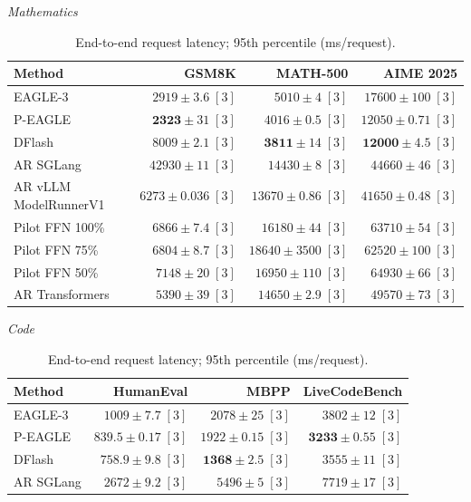 \documentclass[conference,onecolumn]{IEEEtran}
\begin{document}
\begin{table}[!htp]
\centering\small
\setlength{\tabcolsep}{3pt}
\caption{End-to-end request latency; 95th percentile (ms/request).}
\label{tab:appendix-metric-completion-95th-percentile-none}
\textit{Mathematics}\par\smallskip
\begin{tabular}{@{}>{\raggedright\arraybackslash}p{3.7cm}rrr@{}}
\toprule
Method & GSM8K & MATH-500 & AIME 2025 \\
\midrule
EAGLE-3 & \(2919 \pm 3.6\;[3]\) & \(5010 \pm 4\;[3]\) & \(17600 \pm 100\;[3]\) \\
P-EAGLE & \(\mathbf{2323} \pm 31\;[3]\) & \(4016 \pm 0.5\;[3]\) & \(12050 \pm 0.71\;[3]\) \\
DFlash & \(8009 \pm 2.1\;[3]\) & \(\mathbf{3811} \pm 14\;[3]\) & \(\mathbf{12000} \pm 4.5\;[3]\) \\
AR \textperiodcentered{} SGLang & \(42930 \pm 11\;[3]\) & \(14430 \pm 8\;[3]\) & \(44660 \pm 46\;[3]\) \\
AR \textperiodcentered{} vLLM ModelRunnerV1 & \(6273 \pm 0.036\;[3]\) & \(13670 \pm 0.86\;[3]\) & \(41650 \pm 0.48\;[3]\) \\
Pilot FFN 100\% & \(6866 \pm 7.4\;[3]\) & \(16180 \pm 44\;[3]\) & \(63710 \pm 54\;[3]\) \\
Pilot FFN 75\% & \(6804 \pm 8.7\;[3]\) & \(18640 \pm 3500\;[3]\) & \(62520 \pm 100\;[3]\) \\
Pilot FFN 50\% & \(7148 \pm 20\;[3]\) & \(16950 \pm 110\;[3]\) & \(64930 \pm 66\;[3]\) \\
AR \textperiodcentered{} Transformers & \(5390 \pm 39\;[3]\) & \(14650 \pm 2.9\;[3]\) & \(49570 \pm 73\;[3]\) \\
\bottomrule
\end{tabular}\par\medskip
\textit{Code}\par\smallskip
\begin{tabular}{@{}>{\raggedright\arraybackslash}p{3.7cm}rrr@{}}
\toprule
Method & HumanEval & MBPP & LiveCodeBench \\
\midrule
EAGLE-3 & \(1009 \pm 7.7\;[3]\) & \(2078 \pm 25\;[3]\) & \(3802 \pm 12\;[3]\) \\
P-EAGLE & \(839.5 \pm 0.17\;[3]\) & \(1922 \pm 0.15\;[3]\) & \(\mathbf{3233} \pm 0.55\;[3]\) \\
DFlash & \(\mathbf{758.9} \pm 9.8\;[3]\) & \(\mathbf{1368} \pm 2.5\;[3]\) & \(3555 \pm 11\;[3]\) \\
AR \textperiodcentered{} SGLang & \(2672 \pm 9.2\;[3]\) & \(5496 \pm 5\;[3]\) & \(7719 \pm 17\;[3]\) \\

\end{tabular}
\end{table}
\end{document}
